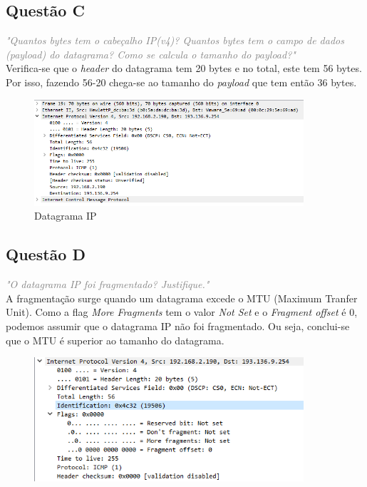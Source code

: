 \documentclass{llncs}
\newcommand{\questionE}[1]{\textcolor{gray}{\textit{"#1"}}}
\begin{document}
\subsection{Questão C}
\hspace{3mm}
\questionE{Quantos bytes tem o cabeçalho IP(v4)? Quantos bytes tem o campo de dados (payload) do datagrama? Como se calcula o tamanho do payload?}\\

Verifica-se que o \textit{header} do datagrama tem 20 bytes e no total, este tem 56 bytes. Por isso, fazendo 56-20 chega-se ao tamanho do \textit{payload} que tem então 36 bytes.

\begin{figure}[H]
\begin{center}
\includegraphics[width=10cm]{2c.PNG}
\end{center}
\caption{Datagrama IP}
\end{figure}

\subsection{Questão D}
\hspace{3mm}
\questionE{O datagrama IP foi fragmentado? Justifique.}\\

A fragmentação surge quando um datagrama excede o MTU (Maximum Tranfer Unit).
Como a flag \textit{More Fragments} tem o valor \textit{Not Set} e o \textit{Fragment offset} é 0, podemos assumir que o datagrama IP não foi fragmentado. Ou seja, conclui-se que o MTU é superior ao tamanho do datagrama.

\begin{figure}[H]
\begin{center}
\includegraphics[width=10cm]{2d.PNG}
\end{center}
\caption{}
\end{figure}
\end{document}
